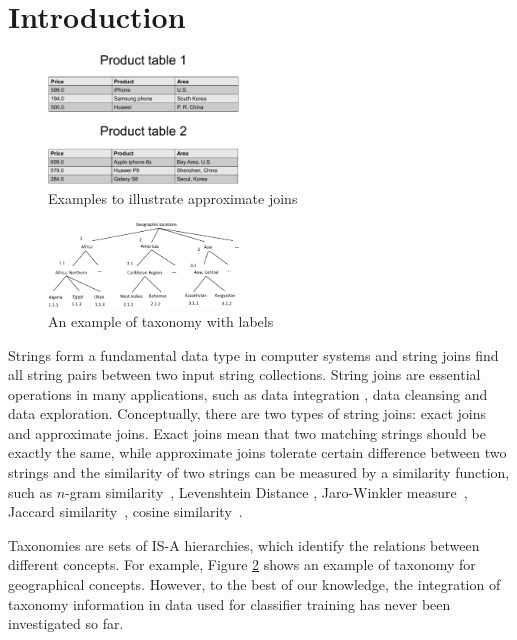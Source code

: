 \section{Introduction}


\begin{figure}[t]
\centering
\includegraphics[width=0.45\textwidth]{figures/productexample}
 \caption{Examples to illustrate approximate joins}
\label{fig:autocompletion}
\end{figure}


\begin{figure}[t]
\centering
\includegraphics[width=0.45\textwidth]{figures/taxonomylabels}
 \caption{An example of taxonomy with labels}
\label{fig:taxonomy}
\end{figure}


Strings form a fundamental data type in computer systems and  string joins find all string pairs between two input string collections.  String joins are essential operations in
many applications, such as  data integration \cite{conf/sigmod/Sarawagi04}, data cleansing \cite{conf/vldb/ArasuGK06,journals/www/LiJM06} and data exploration. Conceptually, there are two types of string joins: exact joins and approximate joins. Exact joins mean that two matching strings should be exactly the same, while approximate joins tolerate certain difference
  between two strings and the similarity of two strings can be measured by a similarity function, such as  $n$-gram similarity~\cite{conf/spire/Kondrak05}, Levenshtein Distance
\cite{journals/pvldb/XiaoWL08,conf/sigmod/WangLF12}, Jaro-Winkler
measure~\cite{Winkler99thestate}, Jaccard
similarity~\cite{conf/icde/ChaudhuriGK06}, cosine
similarity~\cite{journals/ipm/SaltonB88}.


 Taxonomies are sets of IS-A hierarchies, which identify the relations between different concepts. For example, Figure \ref{fig:taxonomy} shows an example of taxonomy for geographical concepts. However, to the best of our knowledge, the integration of taxonomy information in data used for classifier training has never been investigated so far.




